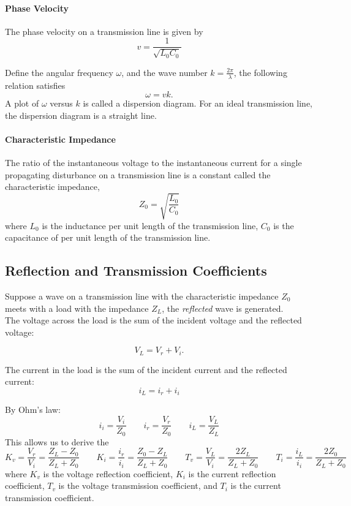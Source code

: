 \documentclass[12pt,a4paper]{article}
\begin{document}
\paragraph{Phase Velocity} The phase velocity on a transmission line is given by
\[
    v = \frac{1}{\sqrt{L_0 C_0}}
\]

Define the angular frequency $\omega$, and the wave number $k = \frac{2\pi}{\lambda}$, the following relation satisfies
\[
    \omega = v k.
\]
A plot of $\omega$ versus $k$ is called a dispersion diagram. For an ideal transmission line, the dispersion diagram is a straight line.

\paragraph{Characteristic Impedance} The ratio of the instantaneous voltage to the instantaneous current for a single propagating disturbance on a transmission line is a constant called the characteristic impedance, 
\[
    Z_0 = \sqrt{\frac{L_0}{C_0}}
\]
where $L_0$ is the inductance per unit length of the transmission line, $C_0$ is the capacitance of per unit length of the transmission line.

\subsection{Reflection and Transmission Coefficients}

Suppose a wave on a transmission line with the characteristic impedance $Z_0$ meets with a load with the impedance $Z_L$, the \textit{reflected} wave is generated. \\

The voltage across the load is the sum of the incident voltage and the reflected voltage:

\[
    V_L = V_r + V_i.
\]

The current in the load is the sum of the incident current and the reflected current:
\[
    i_L = i_r + i_i
\]

By Ohm's law:
\[
    i_i = \frac{V_i}{Z_0} 
    \quad \quad
    i_r = \frac{V_r}{Z_0}
    \quad \quad
    i_L = \frac{V_L}{Z_L}
\]
This allows us to derive the 
\[
    K_v = \frac{V_r}{V_i} = \frac{Z_L - Z_0}{Z_L + Z_0}
    \quad \quad
    K_i = \frac{i_r}{i_i} = \frac{Z_0 - Z_L}{Z_L + Z_0}
    \quad \quad
    T_v = \frac{V_L}{V_i} = \frac{2Z_L}{Z_L + Z_0}
    \quad \quad
    T_i = \frac{i_L}{i_i} = \frac{2Z_0}{Z_L + Z_0}
\]
where $K_v$ is the voltage reflection coefficient, $K_i$ is the current reflection coefficient, $T_v$ is the voltage transmission coefficient, and $T_i$ is the current transmission coefficient.
\end{document}

